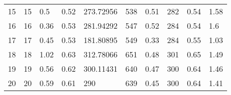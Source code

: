 \documentclass{uofa-eng-assignment}
\begin{document}
\begin{table}[H]
\begin{tabular}{llllllllll}
15 & 15  & 0.5     & 0.52     & 273.72956 & 538     & 0.51 & 282        & 0.54    & 1.58    \\
16 & 16  & 0.36    & 0.53     & 281.94292 & 547     & 0.52 & 284        & 0.54    & 1.6     \\
17 & 17  & 0.45    & 0.53     & 181.80895 & 549     & 0.33 & 284        & 0.55    & 1.03    \\
18 & 18  & 1.02    & 0.63     & 312.78066 & 651     & 0.48 & 301        & 0.65    & 1.49    \\
19 & 19  & 0.56    & 0.62     & 300.11431 & 640     & 0.47 & 300        & 0.64    & 1.46    \\
20 & 20  & 0.59    & 0.61     & 290       & 639     & 0.45 & 300        & 0.64    & 1.41   
\end{tabular}
\end{table}
\end{document}
